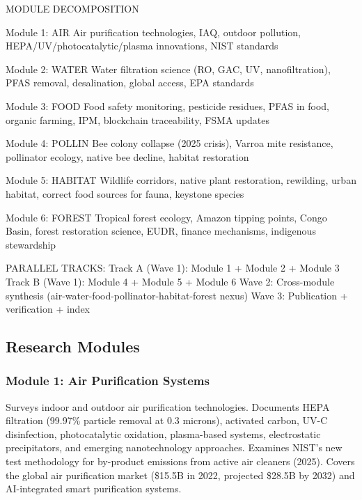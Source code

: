 \documentclass[11pt,letterpaper]{article}
\begin{document}
\begin{asciibox}
MODULE DECOMPOSITION

Module 1: AIR        Air purification technologies, IAQ, outdoor pollution,
                     HEPA/UV/photocatalytic/plasma innovations, NIST standards

Module 2: WATER      Water filtration science (RO, GAC, UV, nanofiltration),
                     PFAS removal, desalination, global access, EPA standards

Module 3: FOOD       Food safety monitoring, pesticide residues, PFAS in food,
                     organic farming, IPM, blockchain traceability, FSMA updates

Module 4: POLLIN     Bee colony collapse (2025 crisis), Varroa mite resistance,
                     pollinator ecology, native bee decline, habitat restoration

Module 5: HABITAT    Wildlife corridors, native plant restoration, rewilding,
                     urban habitat, correct food sources for fauna, keystone species

Module 6: FOREST     Tropical forest ecology, Amazon tipping points, Congo Basin,
                     forest restoration science, EUDR, finance mechanisms, indigenous stewardship

  PARALLEL TRACKS:
  Track A (Wave 1): Module 1 + Module 2 + Module 3
  Track B (Wave 1): Module 4 + Module 5 + Module 6
  Wave 2: Cross-module synthesis (air-water-food-pollinator-habitat-forest nexus)
  Wave 3: Publication + verification + index
\end{asciibox}

\subsection{Research Modules}

\subsubsection{Module 1: Air Purification Systems}
Surveys indoor and outdoor air purification technologies. Documents HEPA filtration (99.97\% particle removal at 0.3 microns), activated carbon, UV-C disinfection, photocatalytic oxidation, plasma-based systems, electrostatic precipitators, and emerging nanotechnology approaches. Examines NIST's new test methodology for by-product emissions from active air cleaners (2025). Covers the global air purification market (\$15.5B in 2022, projected \$28.5B by 2032) and AI-integrated smart purification systems.
\end{document}
